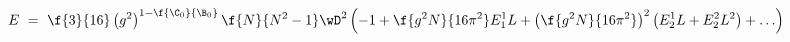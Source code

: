 \begin{equation}\label{e1}
E ~=~
\f{3}{16}\left(g^{2}\right)^{1-\f{\C_{0}}{\B_{0}}}\f{N}{N^{2}-1}\wD^{2}
\left(-1+\f{g^{2}N}{16\pi^{2}}E_{1}^{1} L
+\left(\f{g^{2}N}{16\pi^{2}}\right)^{2}\left(E_{2}^{1}L +
E_{2}^{2}L^{2}\right)+\ldots\right)
\end{equation}

